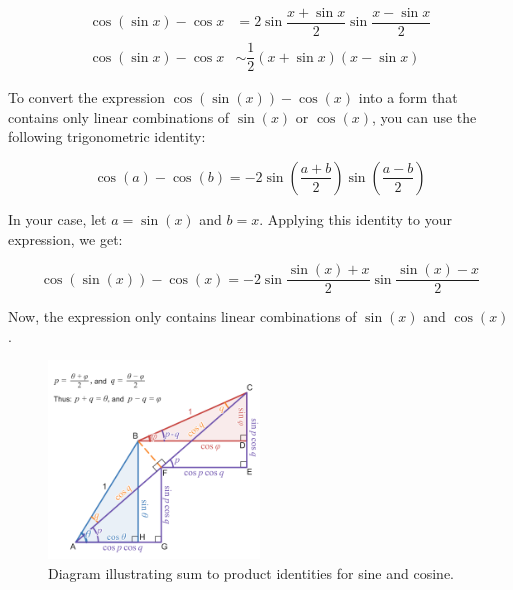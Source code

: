 \begin{corollary}
    \begin{align}
        \cos(\sin x) - \cos x &=    2 \sin \dfrac{x + \sin x}{2} \sin \dfrac{x- \sin x}{2} \label{eq:fucking-socalled-trig-formula} \\
        \cos(\sin x) - \cos x &\sim \dfrac{1}{2} ( x + \sin x )( x - \sin x ) 
    \end{align}
\end{corollary}

To convert the expression $\cos(\sin(x)) - \cos(x)$ 
into a form that contains only linear combinations of 
$\sin(x)$ or $\cos(x)$, 
you can use the following trigonometric identity:

\begin{theorem}
    \label{thm:a-magic-theorem-which-I-dont-know-its-name-about-trig}
    \begin{equation*}
        \cos(a) - \cos(b) = -2 \sin\left(\frac{a + b}{2}\right) \sin\left(\frac{a - b}{2}\right)
    \end{equation*}
\end{theorem}

In your case, let $a = \sin(x)$ and $b = x$. 
Applying this identity to your expression, we get:

\begin{equation*}
    \cos(\sin(x)) - \cos(x) = -2 \sin\frac{\sin(x) + x}{2} \sin\frac{\sin(x) - x}{2}
\end{equation*}

Now, the expression only contains linear combinations of 
$\sin(x)$ and $\cos(x)$.

\begin{figure}
    \centering
    \includegraphics[width=0.5\textwidth]{figure/Diagram_illustrating_sum_to_product_identities_for_sine_and_cosine.png}
    \caption{Diagram illustrating sum to product identities for sine and cosine.}
    \label{fig:Diagram_illustrating_sum_to_product_identities_for_sine_and_cosine}
\end{figure}

